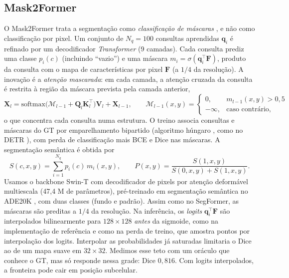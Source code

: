 \subsection{Mask2Former}
O Mask2Former \cite{cheng2022mask2former} trata a segmentação como \emph{classificação de máscaras}
\cite{cheng2021maskformer}, e não como classificação por pixel. Um conjunto de $N_q=100$ consultas
aprendidas $\mathbf{q}_i$ é refinado por um decodificador \emph{Transformer} (9 camadas). Cada
consulta prediz uma classe $p_i(c)$ (incluindo ``vazio'') e uma máscara
$m_i = \sigma(\mathbf{q}_i^\top \mathbf{F})$, produto da consulta com o mapa de características por
pixel $\mathbf{F}$ (a $1/4$ da resolução). A inovação é a \emph{atenção mascarada}: em cada camada,
a atenção cruzada da consulta é restrita à região da máscara prevista pela camada anterior,
\begin{equation}
  \mathbf{X}_l = \mathrm{softmax}\big(\mathcal{M}_{l-1} + \mathbf{Q}_l\mathbf{K}_l^\top\big)\mathbf{V}_l + \mathbf{X}_{l-1},
  \qquad \mathcal{M}_{l-1}(x,y) = \begin{cases} 0, & m_{l-1}(x,y) > 0{,}5\\ -\infty, & \text{caso contrário,}\end{cases}
\end{equation}
o que concentra cada consulta numa estrutura. O treino associa consultas e máscaras do GT por
emparelhamento bipartido (algoritmo húngaro \cite{kuhn1955}, como no DETR \cite{carion2020detr}),
com perda de classificação mais BCE e Dice nas máscaras. A segmentação semântica é obtida por
\begin{equation}
  S(c,x,y) = \sum_{i=1}^{N_q} p_i(c)\, m_i(x,y), \qquad P(x,y) = \frac{S(1,x,y)}{S(0,x,y)+S(1,x,y)}.
\end{equation}
Usamos o backbone Swin-T \cite{liu2021swin} com decodificador de pixels por atenção deformável
multiescala \cite{zhu2021deformable} (47,4 M de parâmetros), pré-treinado em segmentação semântica no
ADE20K \cite{zhou2017ade}, com duas classes (fundo e padrão). Assim como no SegFormer, as máscaras
são preditas a $1/4$ da resolução.
Na inferência, os \emph{logits} $\mathbf{q}_i^\top\mathbf{F}$ são interpolados bilinearmente para
$128\times128$ \emph{antes} da sigmoide, como na implementação de referência e como na perda de
treino, que amostra pontos por interpolação dos logits. Interpolar as probabilidades já saturadas
limitaria o Dice ao de um mapa suave em $32\times32$. Medimos esse teto com um oráculo que conhece o
GT, mas só responde nessa grade: Dice $0{,}816$. Com logits interpolados, a fronteira pode cair em
posição subcelular.

